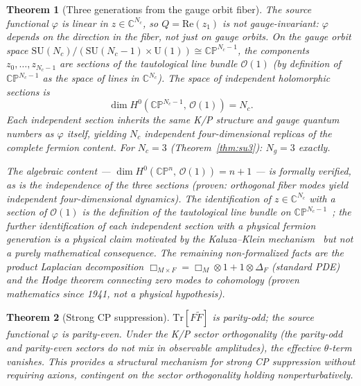 \documentclass[12pt,a4paper]{article}
\newtheorem{theorem}{Theorem}
\begin{document}
\begin{theorem}[Three generations from the gauge orbit fiber]
\label{thm:generations}
The source functional $\varphi$ is linear in $z \in \mathbb{C}^{N_c}$, so $Q = \mathrm{Re}(z_1)$ is not gauge-invariant: $\varphi$ depends on the direction in the fiber, not just on gauge orbits. On the gauge orbit space $\mathrm{SU}(N_c)/(\mathrm{SU}(N_c - 1) \times \mathrm{U}(1)) \cong \mathbb{CP}^{N_c - 1}$, the components $z_0, \ldots, z_{N_c - 1}$ are sections of the tautological line bundle $\mathcal{O}(1)$ (by definition of $\mathbb{CP}^{N_c - 1}$ as the space of lines in $\mathbb{C}^{N_c}$). The space of independent holomorphic sections is
\[
\dim H^0(\mathbb{CP}^{N_c - 1},\, \mathcal{O}(1)) = N_c.
\]
Each independent section inherits the same K/P structure and gauge quantum numbers as $\varphi$ itself, yielding $N_c$ independent four-dimensional replicas of the complete fermion content. For $N_c = 3$ (Theorem~\ref{thm:su3}): $N_g = 3$ exactly.

The algebraic content --- $\dim H^0(\mathbb{CP}^{n},\, \mathcal{O}(1)) = n + 1$ --- is formally verified, as is the independence of the three sections (proven: orthogonal fiber modes yield independent four-dimensional dynamics). The identification of $z \in \mathbb{C}^{N_c}$ with a section of $\mathcal{O}(1)$ is the \emph{definition} of the tautological line bundle on $\mathbb{CP}^{N_c - 1}$~\cite{gh}; the further identification of each independent section with a physical fermion generation is a physical claim motivated by the Kaluza--Klein mechanism~\cite{kk_review} but not a purely mathematical consequence. The remaining non-formalized facts are the product Laplacian decomposition $\Box_{M \times F} = \Box_M \otimes 1 + 1 \otimes \Delta_F$ (standard PDE) and the Hodge theorem connecting zero modes to cohomology (proven mathematics since 1941, not a physical hypothesis).
\end{theorem}

\begin{theorem}[Strong CP suppression]
\label{thm:strongcp}
$\mathrm{Tr}[F\tilde{F}]$ is parity-odd; the source functional $\varphi$ is parity-even. Under the K/P sector orthogonality (the parity-odd and parity-even sectors do not mix in observable amplitudes), the effective $\theta$-term vanishes. This provides a structural mechanism for strong CP suppression without requiring axions, contingent on the sector orthogonality holding nonperturbatively.
\end{theorem}
\end{document}
